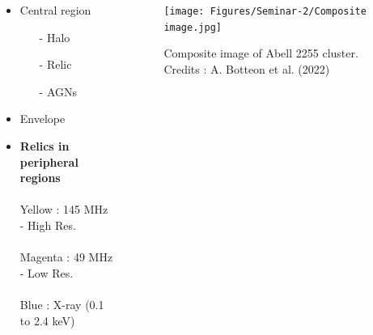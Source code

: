 \documentclass[aspectratio=169]{beamer}
\begin{document}
\begin{markdown}
\begin{frame}{}

\begin{columns}
    \begin{column}{0.31\textwidth} 
         \begin{itemize}
             \item Central region
                \begin{itemize}
                    \item[-] Halo
                    \item[-] Relic
                    \item[-] AGNs
                \end{itemize} 
             \item Envelope
             \item {\textbf{Relics in peripheral regions}} 
             \\\\ \vspace{16mm} \hspace{-4mm}
             \scriptsize{
             Yellow : 145 MHz - High Res. \\\\ \hspace{-3mm}
             Magenta : 49 MHz - Low Res.\\\\ \hspace{-3mm}
             Blue : X-ray (0.1 to 2.4 keV)}
        \end{itemize}
    \end{column}
    \begin{column}{0.8\textwidth}
         \vspace{-2mm}
          \begin{figure}[!htbp]
          \centering
          \texttt{[image: Figures/Seminar-2/Composite image.jpg]}
          \vspace*{-3mm}
          \caption{Composite image of Abell 2255 cluster. Credits :  A. Botteon et al. (2022)}
          \label{}
        \end{figure}
    \end{column}
\end{columns}

    
\end{frame}



\end{markdown}
\end{document}

